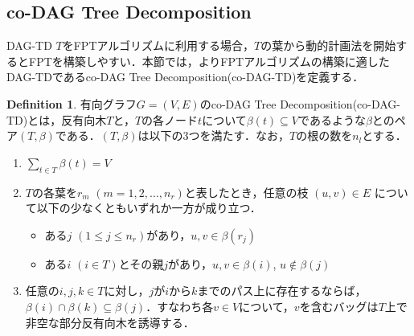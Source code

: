 \documentclass[master]{kuisthesis}		%
\theoremstyle{plain}
\theoremstyle{definition}
\newtheorem{definition*}{Definition}
\begin{document}
\subsection{co-DAG Tree Decomposition}
DAG-TD $T$をFPTアルゴリズムに利用する場合，$T$の葉から動的計画法を開始するとFPTを構築しやすい．本節では，よりFPTアルゴリズムの構築に適したDAG-TDであるco-DAG Tree Decomposition(co-DAG-TD)を定義する．


\begin{definition*}
 有向グラフ$G=(V, E)$のco-DAG Tree Decomposition(co-DAG-TD)とは，反有向木$T$と，$T$の各ノード$t$について$\beta(t) \subseteq V$であるような$\beta$とのペア$(T, \beta)$である．$(T, \beta)$は以下の3つを満たす．なお，$T$の根の数を$n_l$とする．
 
\begin{enumerate}
    \item $\sum_{t\in T} \beta(t) = V$ 
    \item $T$の各葉を$r_m$ $(m = 1, 2, \dots, n_r)$と表したとき，任意の枝 $ (u, v) \in E $ について以下の少なくともいずれか一方が成り立つ．
    \begin{itemize}
          \item ある$j$ $(1 \leq j \leq n_r)$があり，$u, v \in \beta(r_j)$
          \item ある$i$ $(i \in T)$とその親$j$があり，$u, v \in \beta(i)$, $u \notin \beta(j)$
    \end{itemize}
    \item 任意の$ i, j, k \in T$に対し，$j$が$i$から$k$までのパス上に存在するならば，$\beta(i) \cap \beta(k) \subseteq \beta(j)$．すなわち各$v \in V$について，$v$を含むバッグは$T$上で非空な部分反有向木を誘導する．
    \end{enumerate}
\end{definition*}

\end{document}
